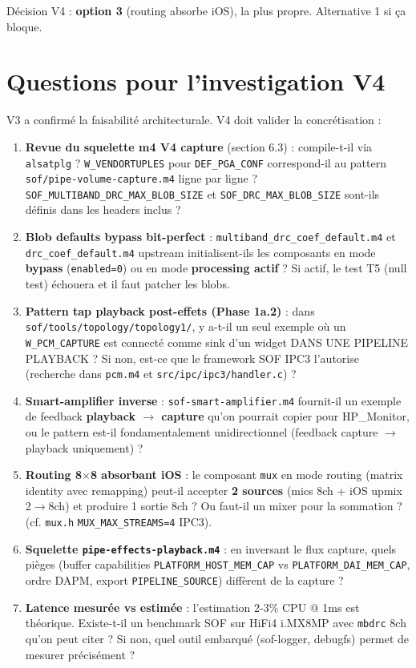 \documentclass[11pt,a4paper]{article}
\begin{document}
Décision V4 : \textbf{option 3} (routing absorbe iOS), la plus propre. Alternative 1 si ça bloque.

\section{Questions pour l'investigation V4}

V3 a confirmé la faisabilité architecturale. V4 doit valider la concrétisation :

\begin{enumerate}[leftmargin=*, itemsep=2pt]
  \item \textbf{Revue du squelette m4 V4 capture} (section 6.3) : compile-t-il via \texttt{alsatplg} ? \texttt{W\_VENDORTUPLES} pour \texttt{DEF\_PGA\_CONF} correspond-il au pattern \texttt{sof/pipe-volume-capture.m4} ligne par ligne ? \texttt{SOF\_MULTIBAND\_DRC\_MAX\_BLOB\_SIZE} et \texttt{SOF\_DRC\_MAX\_BLOB\_SIZE} sont-ils définis dans les headers inclus ?
  \item \textbf{Blob defaults bypass bit-perfect} : \texttt{multiband\_drc\_coef\_default.m4} et \texttt{drc\_coef\_default.m4} upstream initialisent-ils les composants en mode \textbf{bypass} (\texttt{enabled=0}) ou en mode \textbf{processing actif} ? Si actif, le test T5 (null test) échouera et il faut patcher les blobs.
  \item \textbf{Pattern tap playback post-effets (Phase 1a.2)} : dans \texttt{sof/tools/topology/topology1/}, y a-t-il un seul exemple où un \texttt{W\_PCM\_CAPTURE} est connecté comme sink d'un widget DANS UNE PIPELINE PLAYBACK ? Si non, est-ce que le framework SOF IPC3 l'autorise (recherche dans \texttt{pcm.m4} et \texttt{src/ipc/ipc3/handler.c}) ?
  \item \textbf{Smart-amplifier inverse} : \texttt{sof-smart-amplifier.m4} fournit-il un exemple de feedback \textbf{playback $\to$ capture} qu'on pourrait copier pour HP\_Monitor, ou le pattern est-il fondamentalement unidirectionnel (feedback capture $\to$ playback uniquement) ?
  \item \textbf{Routing 8$\times$8 absorbant iOS} : le composant \texttt{mux} en mode routing (matrix identity avec remapping) peut-il accepter \textbf{2 sources} (mics 8ch + iOS upmix 2$\to$8ch) et produire 1 sortie 8ch ? Ou faut-il un mixer pour la sommation ? (cf. \texttt{mux.h} \texttt{MUX\_MAX\_STREAMS=4} IPC3).
  \item \textbf{Squelette \texttt{pipe-effects-playback.m4}} : en inversant le flux capture, quels pièges (buffer capabilities \texttt{PLATFORM\_HOST\_MEM\_CAP} vs \texttt{PLATFORM\_DAI\_MEM\_CAP}, ordre DAPM, export \texttt{PIPELINE\_SOURCE}) diffèrent de la capture ?
  \item \textbf{Latence mesurée vs estimée} : l'estimation 2-3\% CPU @ 1ms est théorique. Existe-t-il un benchmark SOF sur HiFi4 i.MX8MP avec \texttt{mbdrc} 8ch qu'on peut citer ? Si non, quel outil embarqué (sof-logger, debugfs) permet de mesurer précisément ?
\end{enumerate}
\end{document}
